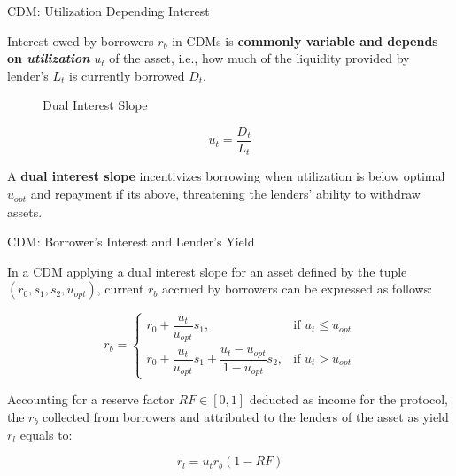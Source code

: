\documentclass[]{beamer}
\begin{document}
\begin{frame}{CDM: Utilization Depending Interest }

Interest owed by borrowers $r_b$ in CDMs is \textbf{commonly variable and depends on \textit{utilization}} $u_t$ of the asset, i.e., how much of the liquidity provided by lender's $L_t$ is currently borrowed $D_t$.

\vspace{1em}

 {
\begin{minipage}{0.6\textwidth}
	\begin{figure}[t]
		\centering
		\begin{tikzpicture}[scale=0.5, every node/.style={scale=0.8}]
			
		\end{tikzpicture}
		\caption{Dual Interest Slope}
	\end{figure}
\end{minipage}
\begin{minipage}{0.38\textwidth}
	\vspace{-1em}
	\begin{equation*}
		u_t = \dfrac{D_t}{L_t}
	\end{equation*}
	
	\vspace{0.5 em}
	A \textbf{dual interest slope} incentivizes borrowing when utilization is below optimal $u_{opt}$ and repayment if its above, threatening the lenders' ability to withdraw assets.
	
\end{minipage}	
}

\end{frame}


\begin{frame}{CDM: Borrower's Interest and Lender's Yield }

In a CDM applying a dual interest slope for an asset defined by the tuple $(r_0, s_1, s_2, u_{opt})$, current $r_b$ accrued by borrowers can be expressed as follows:

\vspace{0.5em}

\begin{equation*}
	r_b = 
		\begin{cases}
		r_0 + \dfrac{u_t}{u_{opt}}s_1, & \text{if } u_t \leq u_{opt}\\
		r_0 + \dfrac{u_t}{u_{opt}}s_1 + \dfrac{u_t-u_{opt}}{1-u_{opt}}s_2, & \text{if } u_t > u_{opt}
		\end{cases}
\end{equation*}

\vspace{2em}

 {
Accounting for a reserve factor $RF \in [0,1]$ deducted as income for the protocol, the $r_b$ collected from borrowers and attributed to the lenders of the asset as yield $r_l$ equals to:

\begin{equation*}
	r_l = u_t r_b (1-RF) 
\end{equation*}
}

\end{frame}
\end{document}
